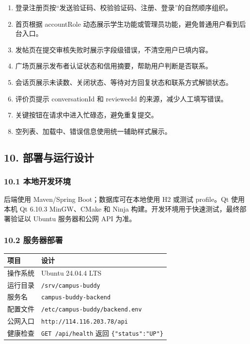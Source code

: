 \documentclass[
]{ctexart}
\providecommand{\tightlist}{%
  \setlength{\itemsep}{0pt}\setlength{\parskip}{0pt}}
\begin{document}
\begin{enumerate}
\def\labelenumi{\arabic{enumi}.}
\tightlist
\item
  登录注册页按``发送验证码、校验验证码、注册、登录''的自然顺序组织。
\item
  首页根据 accountRole
  动态展示学生功能或管理员功能，避免普通用户看到后台入口。
\item
  发帖页在提交审核失败时展示字段级错误，不清空用户已填内容。
\item
  广场页展示发布者认证状态和信用摘要，帮助用户判断是否联系。
\item
  会话页展示未读数、关闭状态、等待对方回复状态和联系方式解锁状态。
\item
  评价页提示 conversationId 和 revieweeId 的来源，减少人工填写错误。
\item
  关键按钮在请求中进入忙碌态，避免重复提交。
\item
  空列表、加载中、错误信息使用统一辅助样式展示。
\end{enumerate}

\hypertarget{ux90e8ux7f72ux4e0eux8fd0ux884cux8bbeux8ba1}{%
\subsection{10.
部署与运行设计}\label{ux90e8ux7f72ux4e0eux8fd0ux884cux8bbeux8ba1}}

\hypertarget{ux672cux5730ux5f00ux53d1ux73afux5883}{%
\subsubsection{10.1
本地开发环境}\label{ux672cux5730ux5f00ux53d1ux73afux5883}}

后端使用 Maven/Spring Boot；数据库可在本地使用 H2 或测试 profile。Qt
使用本机 Qt 6.10.3 MinGW、CMake 和 Ninja
构建。开发环境用于快速测试，最终部署验证以 Ubuntu 服务器和公网 API
为准。

\hypertarget{ux670dux52a1ux5668ux90e8ux7f72}{%
\subsubsection{10.2 服务器部署}\label{ux670dux52a1ux5668ux90e8ux7f72}}

\begin{longtable}[]{@{}ll@{}}
\toprule
项目 & 设计 \\
\midrule
\endhead
操作系统 & Ubuntu 24.04.4 LTS \\
运行目录 & \texttt{/srv/campus-buddy} \\
服务名 & \texttt{campus-buddy-backend} \\
配置文件 & \texttt{/etc/campus-buddy/backend.env} \\
公网入口 & \texttt{http://114.116.203.78/api} \\
健康检查 & \texttt{GET\ /api/health} 返回 \texttt{\{"status":"UP"\}} \\
\bottomrule
\end{longtable}
\end{document}
